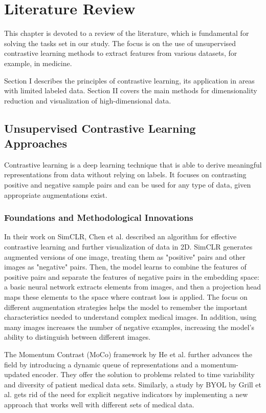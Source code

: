 \chapter{Literature Review}
\label{chap:lr}

This chapter is devoted to a review of the literature, which is fundamental for solving the tasks set in our study. The focus is on the use of unsupervised contrastive learning methods to extract features from various datasets, for example, in medicine. 

Section I describes the principles of contrastive learning, its application in areas with limited labeled data. Section II covers the main methods for dimensionality reduction and visualization of high-dimensional data.

\section{Unsupervised Contrastive Learning Approaches}
Contrastive learning is a deep learning technique that is able to derive meaningful representations from data without relying on labels. It focuses on contrasting positive and negative sample pairs and can be used for any type of data, given appropriate augmentations exist.

\subsection{Foundations and Methodological Innovations}

In their work on SimCLR, Chen et al. \cite{tsimcne} described an algorithm for effective contrastive learning and further visualization of data in 2D. SimCLR generates augmented versions of one image, treating them as "positive" pairs and other images as "negative" pairs. Then, the model learns to combine the features of positive pairs and separate the features of negative pairs in the embedding space: a basic neural network extracts elements from images, and then a projection head maps these elements to the space where contrast loss is applied. The focus on different augmentation strategies helps the model to remember the important characteristics needed to understand complex medical images. In addition, using many images increases the number of negative examples, increasing the model's ability to distinguish between different images.

The Momentum Contrast (MoCo) framework by He et al. \cite{moco} further advances the field by introducing a dynamic queue of representations and a momentum-updated encoder. They offer the solution to problems related to time variability and diversity of patient medical data sets. Similarly, a study by BYOL by Grill et al. \cite{byol} gets rid of the need for explicit negative indicators by implementing a new approach that works well with different sets of medical data.

